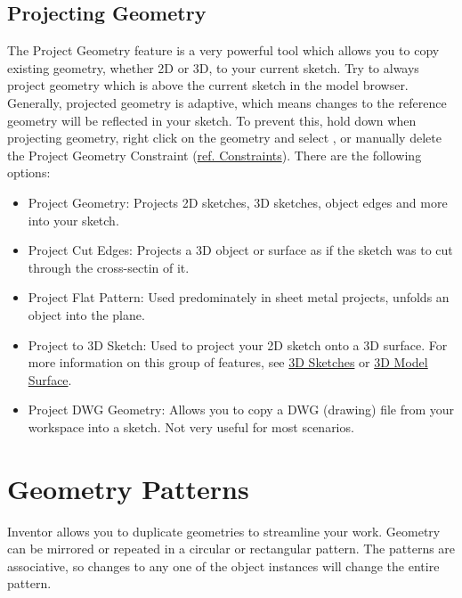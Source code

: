 \subsection{Projecting Geometry}
\label{subsec:proj}


The Project Geometry feature is a very powerful tool which allows you to copy existing geometry, whether 2D or 3D, to your current sketch. Try to always project geometry which is above the current sketch in the model browser. Generally, projected geometry is adaptive, which means changes to the reference geometry will be reflected in your sketch. To prevent this, hold down  when projecting geometry, right click on the geometry and select , or manually delete the Project Geometry Constraint (\hyperref[chap:constraints]{ref. Constraints}). There are the following options:

\begin{itemize}
\item Project Geometry: Projects 2D sketches, 3D sketches, object edges and more into your sketch.
\item Project Cut Edges: Projects a 3D object or surface as if the sketch was to cut through the cross-sectin of it.
\item Project Flat Pattern: Used predominately in sheet metal projects, unfolds an object into the plane.
\item Project to 3D Sketch: Used to project your 2D sketch onto a 3D surface. For more information on this group of features, see \hyperref[section: 3D Sketches]{3D Sketches} or \hyperref[subsection: 3D Model Surface]{3D Model \then Surface}.
\item Project DWG Geometry:  Allows you to copy a DWG (drawing) file from your workspace into a sketch. Not very useful for most scenarios.
\end{itemize}



\section{Geometry Patterns}
\label{section:geom-pattern}


Inventor allows you to duplicate geometries to streamline your work. Geometry can be \newline mirrored or repeated in a circular or rectangular pattern. The patterns are associative, so changes to any one of the object instances will change the entire pattern.


